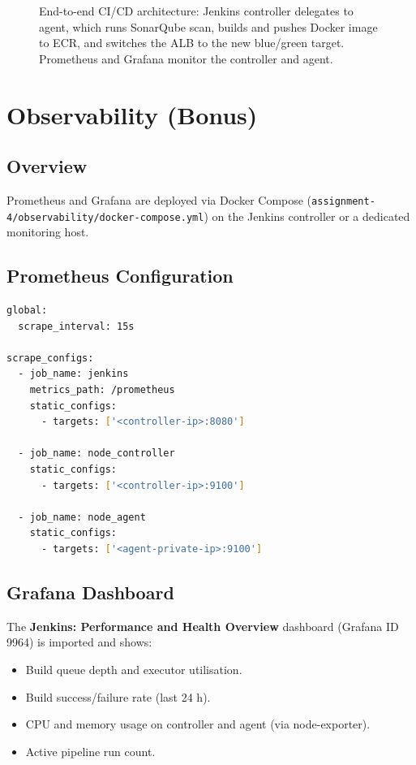 \documentclass[12pt,a4paper]{article}
\begin{document}
\begin{figure}[H]
\begin{tikzpicture}
  \end{tikzpicture}
  \caption{End-to-end CI/CD architecture: Jenkins controller delegates to agent, which runs SonarQube scan, builds and pushes Docker image to ECR, and switches the ALB to the new blue/green target. Prometheus and Grafana monitor the controller and agent.}
  \label{fig:arch}
\end{figure}

\newpage
\section*{Observability (Bonus)}

\subsection*{Overview}
Prometheus and Grafana are deployed via Docker Compose
(\texttt{assignment-4/observability/docker-compose.yml}) on the Jenkins
controller or a dedicated monitoring host.

\subsection*{Prometheus Configuration}

\begin{lstlisting}[language=bash, caption={assignment-4/observability/prometheus.yml}]
global:
  scrape_interval: 15s

scrape_configs:
  - job_name: jenkins
    metrics_path: /prometheus
    static_configs:
      - targets: ['<controller-ip>:8080']

  - job_name: node_controller
    static_configs:
      - targets: ['<controller-ip>:9100']

  - job_name: node_agent
    static_configs:
      - targets: ['<agent-private-ip>:9100']
\end{lstlisting}

\subsection*{Grafana Dashboard}

The \textbf{Jenkins: Performance and Health Overview} dashboard (Grafana ID 9964)
is imported and shows:
\begin{itemize}[noitemsep, leftmargin=*]
  \item Build queue depth and executor utilisation.
  \item Build success/failure rate (last 24 h).
  \item CPU and memory usage on controller and agent (via node-exporter).
  \item Active pipeline run count.
\end{itemize}
\end{document}
